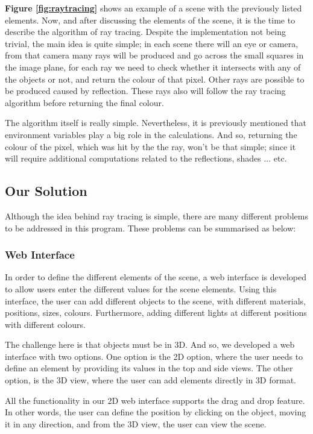 \documentclass[a4paper]{article}
\begin{document}
	\par \textbf{Figure \ref{fig:raytracing}} shows an example of a scene with the previously listed elements. Now, and after discussing the elements of the scene, it is the time to describe the algorithm of ray tracing. Despite the implementation not being trivial, the main idea is quite simple; in each scene there will an eye or camera, from that camera many rays will be produced and go across the small squares in the image plane, for each ray we need to check whether it intersects with any of the objects or not, and return the colour of that pixel. Other rays are possible to be produced caused by reflection. These rays also will follow the ray tracing algorithm before returning the final colour.\\
	\par The algorithm itself is really simple. Nevertheless, it is previously mentioned that environment variables play a big role in the calculations. And so, returning the colour of the pixel, which was hit by the the ray, won't be that simple; since it will require additional computations related to the reflections, shades ... etc. 
	\subsection{Our Solution}
	Although the idea behind ray tracing is simple, there are many different problems to be addressed in this program. These problems can be summarised as below:
	\subsubsection{Web Interface}
	In order to define the different elements of the scene, a web interface is developed to allow users enter the different values for the scene elements. Using this interface, the user can add different objects to the scene, with different materials, positions, sizes, colours. Furthermore, adding different lights at different positions with different colours. \\
	\par The challenge here is that objects must be in 3D. And so, we developed a web interface with two options. One option is the 2D option, where the user needs to define an element by providing its values in the top and side views. The other option, is the 3D view, where the user can add elements directly in 3D format.\\
	\par All the functionality in our 2D web interface supports the drag and drop feature. In other words, the user can define the position by clicking on the object, moving it in any direction, and from the 3D view, the user can view the scene.
\end{document}
